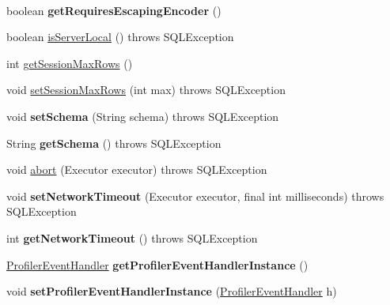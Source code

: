 \begin{DoxyCompactItemize}
$$\item 
\mbox{\label{classcom_1_1mysql_1_1jdbc_1_1_connection_impl_a8551c60c3f22fcc530f3e32427bcb094}} 
boolean {\bfseries get\+Requires\+Escaping\+Encoder} ()
\item 
boolean \mbox{\hyperlink{classcom_1_1mysql_1_1jdbc_1_1_connection_impl_a88cfb69a36df841dccfba314da816213}{is\+Server\+Local}} ()  throws S\+Q\+L\+Exception 
\item 
int \mbox{\hyperlink{classcom_1_1mysql_1_1jdbc_1_1_connection_impl_a7fc47c9a352c1cd244637860dda48c68}{get\+Session\+Max\+Rows}} ()
\item 
void \mbox{\hyperlink{classcom_1_1mysql_1_1jdbc_1_1_connection_impl_abdb4abb6fabad5cd48ac8b4d4e9c37cd}{set\+Session\+Max\+Rows}} (int max)  throws S\+Q\+L\+Exception 
\item 
\mbox{\label{classcom_1_1mysql_1_1jdbc_1_1_connection_impl_a1631c2a9be99971febe8c321c4e2f6d7}} 
void {\bfseries set\+Schema} (String schema)  throws S\+Q\+L\+Exception 
\item 
\mbox{\label{classcom_1_1mysql_1_1jdbc_1_1_connection_impl_a8ebd050362e394d5dd92c704579943ec}} 
String {\bfseries get\+Schema} ()  throws S\+Q\+L\+Exception 
\item 
void \mbox{\hyperlink{classcom_1_1mysql_1_1jdbc_1_1_connection_impl_a44359ff304c24e670d6e0a1214c330cc}{abort}} (Executor executor)  throws S\+Q\+L\+Exception 
\item 
\mbox{\label{classcom_1_1mysql_1_1jdbc_1_1_connection_impl_a412337045965cb8b5b005ffce0b27832}} 
void {\bfseries set\+Network\+Timeout} (Executor executor, final int milliseconds)  throws S\+Q\+L\+Exception 
\item 
\mbox{\label{classcom_1_1mysql_1_1jdbc_1_1_connection_impl_aa689b271a36fd20e3c5d1203e8797d9c}} 
int {\bfseries get\+Network\+Timeout} ()  throws S\+Q\+L\+Exception 
\item 
\mbox{\label{classcom_1_1mysql_1_1jdbc_1_1_connection_impl_a06210a8597e64ed91e81e0ac762cb774}} 
\mbox{\hyperlink{interfacecom_1_1mysql_1_1jdbc_1_1profiler_1_1_profiler_event_handler}{Profiler\+Event\+Handler}} {\bfseries get\+Profiler\+Event\+Handler\+Instance} ()
\item 
\mbox{\label{classcom_1_1mysql_1_1jdbc_1_1_connection_impl_a2388b48849926dd3fc49b0e1a144222f}} 
void {\bfseries set\+Profiler\+Event\+Handler\+Instance} (\mbox{\hyperlink{interfacecom_1_1mysql_1_1jdbc_1_1profiler_1_1_profiler_event_handler}{Profiler\+Event\+Handler}} h)
\end{DoxyCompactItemize}
